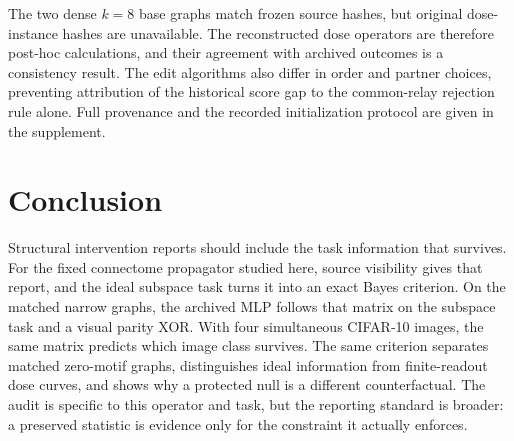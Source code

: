 The two dense $k=8$ base graphs match frozen source hashes, but original
dose-instance hashes are unavailable. The reconstructed dose operators
are therefore post-hoc calculations, and their agreement with archived
outcomes is a consistency result. The edit algorithms also differ in order
and partner choices, preventing attribution of the historical score gap
to the common-relay rejection rule alone. Full provenance and the
recorded initialization protocol are given in the supplement.

\section{Conclusion}
\label{sec:conclusion}

Structural intervention reports should include the task information that survives.
For the fixed connectome propagator studied here, source visibility gives that
report, and the ideal subspace task turns it into an exact Bayes criterion.
On the matched narrow graphs, the archived MLP follows that matrix on the
subspace task and a visual parity XOR. With four simultaneous CIFAR-10 images, the same
matrix predicts which image class survives.
The same criterion separates matched zero-motif graphs, distinguishes ideal
information from finite-readout dose curves, and shows why a protected null
is a different counterfactual. The audit is specific to this operator and task,
but the reporting standard is broader: a preserved statistic is evidence only
for the constraint it actually enforces.
